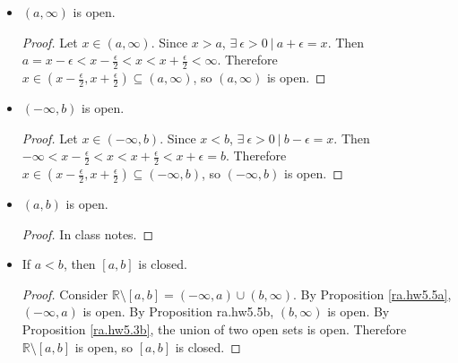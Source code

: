 \begin{itemize}

\item \begin{proposition}\label{ra.hw5.5b} \((a, \infty)\) is open. \end{proposition}

\begin{proof} Let \(x \in (a, \infty)\). Since \(x > a\), \(\exists \ \epsilon >0 \ | \ a +  \epsilon = x\). Then \(a = x - \epsilon < x - \frac{\epsilon}{2} < x < x + \frac{\epsilon}{2} < \infty\). Therefore \(x \in (x - \frac{\epsilon}{2}, x + \frac{\epsilon}{2}) \subseteq (a, \infty)\), so \((a, \infty)\) is open. \end{proof}

\item \begin{proposition}\label{ra.hw5.5a} \((-\infty, b)\) is open. \end{proposition}

\begin{proof} Let \(x \in (-\infty, b)\). Since \(x < b\), \(\exists \ \epsilon >0 \ | \ b - \epsilon = x\). Then \(-\infty < x - \frac{\epsilon}{2} < x < x + \frac{\epsilon}{2} < x + \epsilon = b\). Therefore \(x \in (x - \frac{\epsilon}{2}, x + \frac{\epsilon}{2}) \subseteq (-\infty, b)\), so \((-\infty, b)\) is open. \end{proof}

\item \begin{proposition}\((a, b)\) is open. \end{proposition}

\begin{proof} In class notes. \end{proof}

\item \begin{proposition}\label{ra.hw5.5c} If \(a < b\), then \([a, b]\) is closed. \end{proposition} 

\begin{proof} Consider \(\mathbb{R} \setminus [a, b] = (-\infty, a) \cup (b, \infty)\). By Proposition \ref{ra.hw5.5a}, \((-\infty, a) \) is open. By Proposition {ra.hw5.5b}, \((b, \infty)\) is open. By Proposition \ref{ra.hw5.3b}, the union of two open sets is open. Therefore \(\mathbb{R} \setminus [a, b]\) is open, so \([a, b]\) is closed. \end{proof}


\end{itemize}

